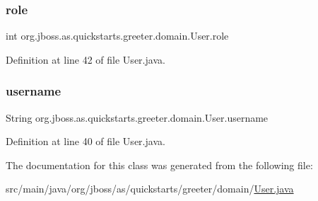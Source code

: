 \subsubsection{\texorpdfstring{role}{role}}
{\footnotesize\ttfamily int org.\+jboss.\+as.\+quickstarts.\+greeter.\+domain.\+User.\+role\hspace{0.3cm}{\ttfamily [private]}}



Definition at line 42 of file User.\+java.

\mbox{\label{classorg_1_1jboss_1_1as_1_1quickstarts_1_1greeter_1_1domain_1_1_user_a111bb41fcb9076cd724197685892ca16}} 
\subsubsection{\texorpdfstring{username}{username}}
{\footnotesize\ttfamily String org.\+jboss.\+as.\+quickstarts.\+greeter.\+domain.\+User.\+username\hspace{0.3cm}{\ttfamily [private]}}



Definition at line 40 of file User.\+java.



The documentation for this class was generated from the following file\+:\begin{DoxyCompactItemize}
\item 
src/main/java/org/jboss/as/quickstarts/greeter/domain/\hyperlink{_user_8java}{User.\+java}\end{DoxyCompactItemize}
